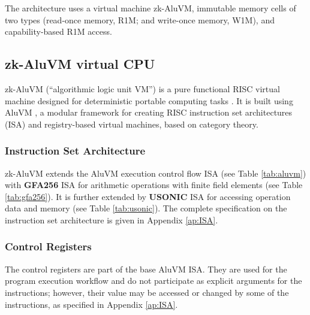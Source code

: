 \documentclass[9pt,oneside]{amsart}
\begin{document}
\begin{multicols}{2}

The architecture uses a virtual machine zk-AluVM, immutable memory cells of two types
(read-once memory, R1M; and write-once memory, W1M), and capability-based R1M access.

\subsection{zk-AluVM virtual CPU}\label{AluVM}

zk-AluVM (``algorithmic logic unit VM'') is a pure functional RISC virtual machine
designed for deterministic portable computing tasks \cite{zkAluVM}.
It is built using AluVM \cite{AluVM, AluVMCrate},
a modular framework for creating RISC instruction set architectures (ISA)
and registry-based virtual machines, based on category theory.

\subsubsection{Instruction Set Architecture}

zk-AluVM extends the AluVM execution control flow ISA (see Table \ref{tab:aluvm})
with \textbf{GFA256} ISA for arithmetic operations
with finite field elements (see Table \ref{tab:gfa256}).
It is further extended by \textbf{USONIC} ISA
for accessing operation data and memory (see Table \ref{tab:usonic}).
The complete specification on the instruction set architecture is given in Appendix \ref{ap:ISA}.

\subsubsection{Control Registers}\label{Registers}

The control registers are part of the base AluVM ISA.
They are used for the program execution workflow and do not participate
as explicit arguments for the instructions; however, their value may be accessed or changed
by some of the instructions, as specified in Appendix \ref{ap:ISA}.


\end{multicols}
\end{document}
